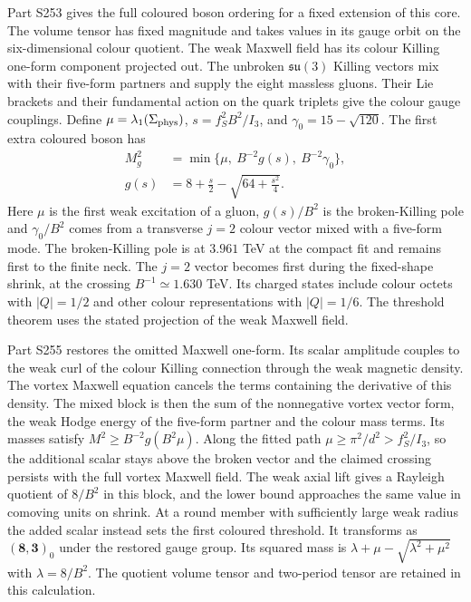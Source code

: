 \documentclass[aps,prd,reprint,onecolumn,nofootinbib,amsmath,amssymb]{revtex4-2}
\begin{document}
Part S253 gives the full coloured boson ordering for a fixed extension of this core. The volume tensor has fixed magnitude and takes values in its gauge orbit on the six-dimensional colour quotient. The weak Maxwell field has its colour Killing one-form component projected out. The unbroken $\mathfrak{su}(3)$ Killing vectors mix with their five-form partners and supply the eight massless gluons. Their Lie brackets and their fundamental action on the quark triplets give the colour gauge couplings. Define $\mu=\lambda_1(\Sigma_{\rm phys})$, $s=f_S^2 B^2/I_3$, and $\gamma_0=15-\sqrt{120}$. The first extra coloured boson has
\begin{equation}
 \begin{aligned}
 M_g^2&=\min\{\mu,\ B^{-2}g(s),\ B^{-2}\gamma_0\},\\
 g(s)&=8+\frac{s}{2}-\sqrt{64+\frac{s^2}{4}} .
 \end{aligned}
\end{equation}
Here $\mu$ is the first weak excitation of a gluon, $g(s)/B^2$ is the broken-Killing pole and $\gamma_0/B^2$ comes from a transverse $j=2$ colour vector mixed with a five-form mode. The broken-Killing pole is at $3.961$ TeV at the compact fit and remains first to the finite neck. The $j=2$ vector becomes first during the fixed-shape shrink, at the crossing $B^{-1}\simeq 1.630$ TeV. Its charged states include colour octets with $|Q|=1/2$ and other colour representations with $|Q|=1/6$. The threshold theorem uses the stated projection of the weak Maxwell field.

Part S255 restores the omitted Maxwell one-form. Its scalar amplitude couples to the weak curl of the colour Killing connection through the weak magnetic density. The vortex Maxwell equation cancels the terms containing the derivative of this density. The mixed block is then the sum of the nonnegative vortex vector form, the weak Hodge energy of the five-form partner and the colour mass terms. Its masses satisfy $M^2\ge B^{-2}g(B^2\mu)$. Along the fitted path $\mu\ge\pi^2/d^2> f_S^2/I_3$, so the additional scalar stays above the broken vector and the claimed crossing persists with the full vortex Maxwell field. The weak axial lift gives a Rayleigh quotient of $8/B^2$ in this block, and the lower bound approaches the same value in comoving units on shrink. At a round member with sufficiently large weak radius the added scalar instead sets the first coloured threshold. It transforms as $(\mathbf8,\mathbf3)_0$ under the restored gauge group. Its squared mass is $\lambda+\mu-\sqrt{\lambda^2+\mu^2}$ with $\lambda=8/B^2$. The quotient volume tensor and two-period tensor are retained in this calculation.
\end{document}

